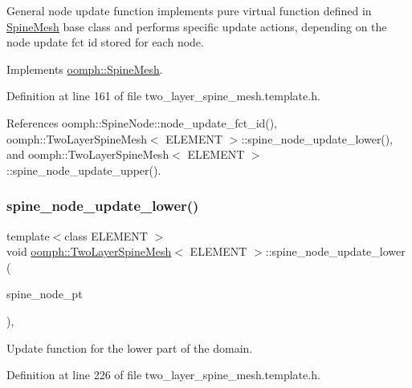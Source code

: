 General node update function implements pure virtual function defined in \hyperlink{classoomph_1_1SpineMesh}{Spine\+Mesh} base class and performs specific update actions, depending on the node update fct id stored for each node. 



Implements \hyperlink{classoomph_1_1SpineMesh_aa7843aadce3c540f34442671f59eb75b}{oomph\+::\+Spine\+Mesh}.



Definition at line 161 of file two\+\_\+layer\+\_\+spine\+\_\+mesh.\+template.\+h.



References oomph\+::\+Spine\+Node\+::node\+\_\+update\+\_\+fct\+\_\+id(), oomph\+::\+Two\+Layer\+Spine\+Mesh$<$ E\+L\+E\+M\+E\+N\+T $>$\+::spine\+\_\+node\+\_\+update\+\_\+lower(), and oomph\+::\+Two\+Layer\+Spine\+Mesh$<$ E\+L\+E\+M\+E\+N\+T $>$\+::spine\+\_\+node\+\_\+update\+\_\+upper().

\mbox{\label{classoomph_1_1TwoLayerSpineMesh_a7973ed642b9adff26bf531c76dade747}} 
\subsubsection{\texorpdfstring{spine\+\_\+node\+\_\+update\+\_\+lower()}{spine\_node\_update\_lower()}}
{\footnotesize\ttfamily template$<$class E\+L\+E\+M\+E\+NT $>$ \\
void \hyperlink{classoomph_1_1TwoLayerSpineMesh}{oomph\+::\+Two\+Layer\+Spine\+Mesh}$<$ E\+L\+E\+M\+E\+NT $>$\+::spine\+\_\+node\+\_\+update\+\_\+lower (\begin{DoxyParamCaption}\item[{\hyperlink{classoomph_1_1SpineNode}{Spine\+Node} $\ast$}]{spine\+\_\+node\+\_\+pt }\end{DoxyParamCaption})\hspace{0.3cm}{\ttfamily [inline]}, {\ttfamily [protected]}}



Update function for the lower part of the domain. 



Definition at line 226 of file two\+\_\+layer\+\_\+spine\+\_\+mesh.\+template.\+h.



